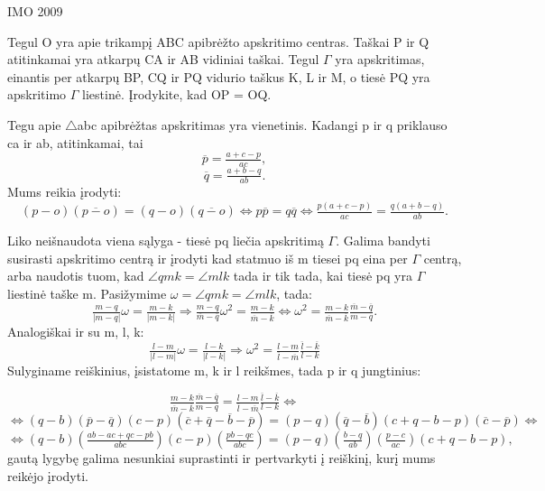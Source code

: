 \begin{pavnr}
IMO 2009

Tegul O yra apie trikampį ABC apibrėžto apskritimo
centras. Taškai P ir Q atitinkamai yra atkarpų CA ir AB vidiniai
taškai. Tegul $\Gamma$ yra apskritimas, einantis per atkarpų BP, CQ ir
PQ vidurio taškus K, L ir M, o tiesė PQ yra apskritimo $\Gamma$ liestinė.
Įrodykite, kad OP = OQ.
\end{pavnr}
\begin{sprendimas}

Tegu apie $\bigtriangleup$abc apibrėžtas apskritimas yra vienetinis. Kadangi p ir q priklauso ca ir ab, atitinkamai, tai
\begin{equation*}
\overline{p}=\tfrac{a+c-p}{ac},
\end{equation*}
\begin{equation*}
\overline{q}=\tfrac{a+b-q}{ab}.
\end{equation*}
Mums reikia įrodyti:
\begin{equation*}
(p-o)(\overline{p-o})=(q-o)(\overline{q-o}) \Leftrightarrow p\overline{p}=q\overline{q} \Leftrightarrow \tfrac{p(a+c-p)}{ac}=\tfrac{q(a+b-q)}{ab}.
\end{equation*}

Liko neišnaudota viena sąlyga - tiesė pq liečia apskritimą $\Gamma$. Galima bandyti susirasti apskritimo centrą ir įrodyti kad statmuo iš m tiesei pq eina per $\Gamma$ centrą, arba naudotis tuom, kad $\angle qmk=\angle mlk$ tada ir tik tada, kai tiesė pq yra $\Gamma$ liestinė taške m. Pasižymime $\omega=\angle qmk=\angle mlk$, tada:
\begin{equation*}
\tfrac{m-q}{|m-q|}\omega=\tfrac{m-k}{|m-k|} \Rightarrow \tfrac{m-q}{\overline{m}-\overline{q}}\omega^2=\tfrac{m-k}{\overline{m}-\overline{k}} \Leftrightarrow \omega^2=\tfrac{m-k}{\overline{m}-\overline{k}} \tfrac{\overline{m}-\overline{q}}{m-q}.
\end{equation*}
Analogiškai ir su m, l, k:
\begin{equation*}
\tfrac{l-m}{|l-m|}\omega=\tfrac{l-k}{|l-k|} \Rightarrow  \omega^2=\tfrac{l-m}{\overline{l}-\overline{m}}\tfrac{\overline{l}-\overline{k}}{l-k}
\end{equation*}
Sulyginame reiškinius, įsistatome m, k ir l reikšmes, tada p ir q jungtinius:

\begin{equation*}
 \tfrac{m-k}{\overline{m}-\overline{k}} \tfrac{\overline{m}-\overline{q}}{m-q}=\tfrac{l-m}{\overline{l}-\overline{m}}\tfrac{\overline{l}-\overline{k}}{l-k} \Leftrightarrow 
\end{equation*}
\begin{equation*}
 \Leftrightarrow (q-b)(\overline{p}-\overline{q})(c-p)(\overline{c}+\overline{q}-\overline{b}-\overline{p})=(p-q)(\overline{q}-\overline{b})(c+q-b-p)(\overline{c}-\overline{p}) \Leftrightarrow
\end{equation*}
\begin{equation*}
\Leftrightarrow (q-b)(\tfrac{ab-ac+qc-pb}{abc})(c-p)(\tfrac{pb-qc}{abc})=(p-q)(\tfrac{b-q}{ab})(\tfrac{p-c}{ac})(c+q-b-p),
\end{equation*}
gautą lygybę galima nesunkiai suprastinti ir pertvarkyti į reiškinį, kurį mums reikėjo įrodyti.
\end{sprendimas}

